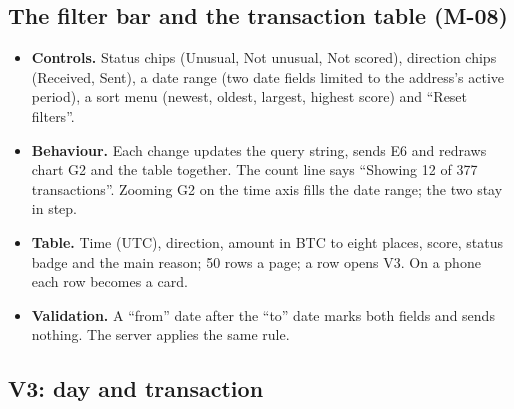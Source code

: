 \subsection{The filter bar and the transaction table (M-08)}
\label{sec:filters}

\begin{itemize}
  \item \textbf{Controls.} Status chips (Unusual, Not unusual, Not scored), direction chips
    (Received, Sent), a date range (two date fields limited to the address's active period), a
    sort menu (newest, oldest, largest, highest score) and ``Reset filters''.
  \item \textbf{Behaviour.} Each change updates the query string, sends E6 and redraws chart G2
    and the table together. The count line says ``Showing 12 of 377 transactions''. Zooming G2 on
    the time axis fills the date range; the two stay in step.
  \item \textbf{Table.} Time (UTC), direction, amount in BTC to eight places, score, status badge
    and the main reason; 50 rows a page; a row opens V3. On a phone each row becomes a card.
  \item \textbf{Validation.} A ``from'' date after the ``to'' date marks both fields and sends
    nothing. The server applies the same rule.
\end{itemize}

\subsection{V3: day and transaction}

